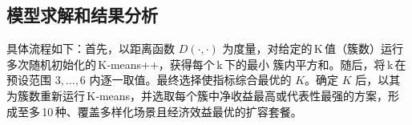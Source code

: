 


\subsection[\hspace{-2pt}模型求解和结果分析]{{\heiti{} \hspace{-8pt}模型求解和结果分析}}\label{section2: 模型求解和结果分析}

具体流程如下：首先，以距离函数 $D(\cdot,\cdot)$ 为度量，对给定的 K 值（簇数）运行多次随机初始化的 K‑means++，获得每个 k 下的最小 簇内平方和。随后，将 k 在预设范围 $3,\dots ,6$ 内逐一取值。最终选择使指标综合最优的 $K$。确定 $K$ 后，以其为簇数重新运行 K‑means，并选取每个簇中净收益最高或代表性最强的方案，形成至多 10 种、覆盖多样化场景且经济效益最优的扩容套餐。

